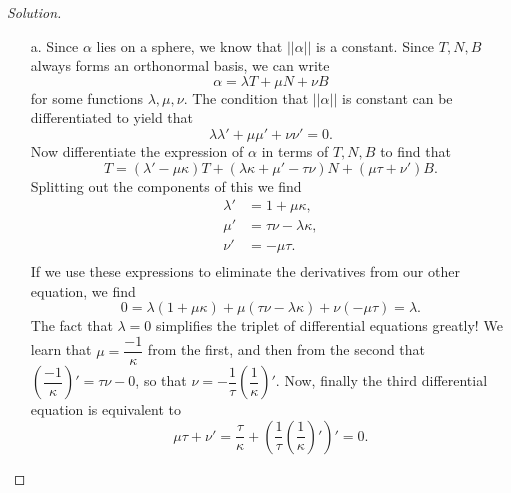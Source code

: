 \documentclass[Shifrin_Solutions_Spring_2015]{subfiles}
\begin{document}
\begin{proof}[Solution] {$\ $} \\
\begin{itemize}
\item[a.] Since $\alpha$ lies on a sphere, we know that $||\alpha||$ is a constant. Since $T, N, B$ always forms an orthonormal basis, we can write
\[
\alpha = \lambda T + \mu N + \nu B
\]
for some functions $\lambda, \mu, \nu$.  The condition that $||\alpha||$ is constant can be differentiated to yield that
\begin{equation*}%
\lambda \lambda' + \mu \mu' + \nu\nu' = 0.
\end{equation*}
Now differentiate the expression of $\alpha$ in terms of $T, N, B$ to find that
\begin{equation*}
T = (\lambda' - \mu \kappa) T + (\lambda \kappa + \mu' -\tau \nu) N + ( \mu \tau+ \nu') B .
\end{equation*}
Splitting out the components of this we find
\begin{align*}%
\lambda' & = 1 + \mu \kappa , \\
\mu ' & = \tau \nu - \lambda \kappa , \\
\nu' & = -\mu \tau .\\
\end{align*}
If we use these expressions to eliminate the derivatives from our other equation, we find
\[
0 = \lambda (1+\mu \kappa) + \mu (\tau \nu - \lambda \kappa) + \nu (-\mu\tau) = \lambda.
\]
The fact that $\lambda = 0$ simplifies the triplet of differential equations greatly! We learn that  $\mu = \dfrac{-1}{\kappa}$ from the first, and then from the second that
$ \left( \dfrac{-1}{\kappa}\right)' = \tau \nu -0$, so that $\nu = -\dfrac{1}{\tau}\left(\dfrac{1}{\kappa}\right)'$. Now, finally the third differential equation is equivalent to
\[
\mu \tau + \nu' = \dfrac{\tau}{\kappa} + \left(\dfrac{1}{\tau} \left(\dfrac{1}{\kappa}\right)' \right)' =0 .
\]


\end{itemize}
\end{proof}
\end{document}
